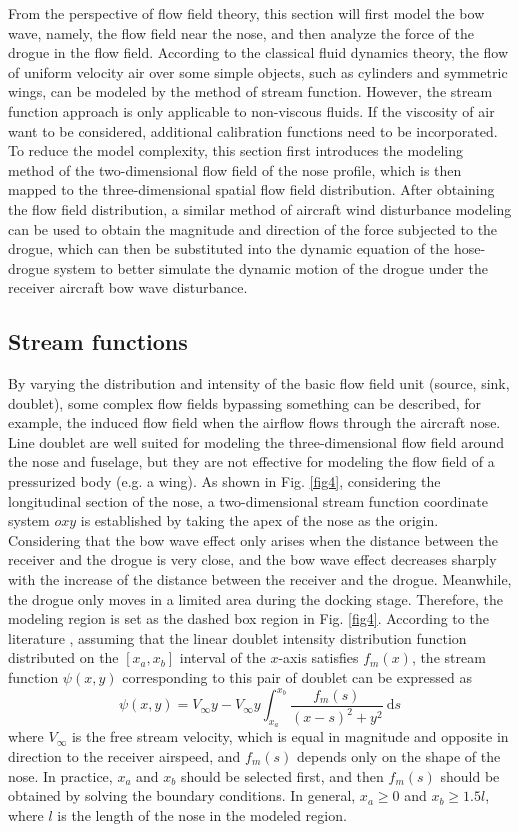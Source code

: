 From the perspective of flow field theory, this section will first model the bow wave, namely, the flow field near the nose, and then analyze the force of the drogue in the flow field. According to the classical fluid dynamics theory, the flow of uniform velocity air over some simple objects, such as cylinders and symmetric wings, can be modeled by the method of stream function. However, the stream function approach is only applicable to non-viscous fluids. If the viscosity of air want to be considered, additional calibration functions need to be incorporated. To reduce the model complexity, this section first introduces the modeling method of the two-dimensional flow field of the nose profile, which is then mapped to the three-dimensional spatial flow field distribution. After obtaining the flow field distribution, a similar method of aircraft wind disturbance modeling can be used to obtain the magnitude and direction of the force subjected to the drogue, which can then be substituted into the dynamic equation of the hose-drogue system to better simulate the dynamic motion of the drogue under the receiver aircraft bow wave disturbance.
\subsection{Stream functions}
By varying the distribution and intensity of the basic flow field unit (source, sink, doublet), some complex flow fields bypassing something can be described, for example, the induced flow field when the airflow flows through the aircraft nose. Line doublet are well suited for modeling the three-dimensional flow field around the nose and fuselage, but they are not effective for modeling the flow field of a pressurized body (e.g. a wing). As shown in Fig. \ref{fig4}, considering the longitudinal section of the nose, a two-dimensional stream function coordinate system $oxy$ is established by taking the apex of the nose as the origin. Considering that the bow wave effect only arises when the distance between the receiver and the drogue is very close, and the bow wave effect decreases sharply with the increase of the distance between the receiver and the drogue. Meanwhile, the drogue only moves in a limited area during the docking stage. Therefore, the modeling region is set as the dashed box region in Fig. \ref{fig4}. According to the literature \cite{rauscher1953introduction}, assuming that the linear doublet intensity distribution function distributed on the $[x_a,x_b]$ 
interval of the $x$-axis satisfies $f_m(x)$, the stream function $\psi{(x,y)}$ corresponding to this pair of doublet can be expressed as
\begin{equation}\label{eq20}
\psi(x, y)=V_{\infty} y-V_{\infty} y \int_{x_a}^{x_b} \frac{f_m(s)}{(x-s)^2+y^2} \mathrm{~d} s
\end{equation}
where $V_\infty$ is the free stream velocity, which is equal in magnitude and opposite in direction to the receiver airspeed, and $f_m(s)$ depends only on the shape of the nose. In practice, $x_a$ and $x_b$ should be selected first, and then ${f}_m(s)$ should be obtained by solving the boundary conditions. In general, $x_a\geq0$ and $x_b\geq1.5l$, where $l$ is the length of the nose in the modeled region.

